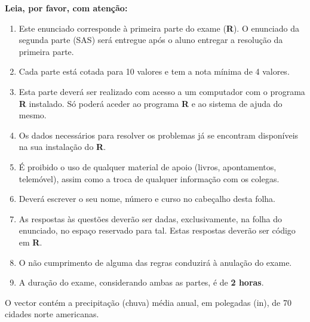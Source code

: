 \documentclass[addpoints]{exam}
\begin{document}
{{\large\textbf{Leia, por favor, com atenção:}}
\begin{enumerate}
	\item Este enunciado corresponde à primeira parte do exame (\textbf{R}). O enunciado da segunda parte (SAS) será entregue após o aluno entregar a resolução da primeira parte.
	\item Cada parte está cotada para 10 valores e tem a nota mínima de 4 valores. 
	\item Esta parte deverá ser realizado com acesso a um computador com o programa \textbf{R} instalado. Só poderá aceder ao programa \textbf{R} e ao sistema de ajuda do mesmo.
	\item Os dados necessários para resolver os problemas já se encontram disponíveis na sua instalação do \textbf{R}.
	\item É proibido o uso de qualquer material de apoio (livros, apontamentos, telemóvel), assim como a troca de qualquer informação com os colegas.
	\item Deverá escrever o seu nome, número e curso no cabeçalho desta folha.
	\item As respostas às questões deverão ser dadas, exclusivamente, na folha do enunciado, no espaço reservado para tal. Estas respostas deverão ser código em \textbf{R}.
	\item O não cumprimento de alguma das regras conduzirá à anulação do exame.
	\item A duração do exame, considerando ambas as partes, é de \textbf{2 horas}.
\end{enumerate}

\vspace{10mm}

\begin{questions}
	\question O vector  contém a precipitação (chuva) média anual, em polegadas (in), de 70 cidades norte americanas.
	
\end{questions}}
\end{document}
